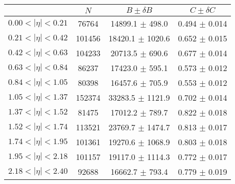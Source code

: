 \begin{tabular}{lccc}
\hline
    &   $N$   & $B \pm \delta B$  &  $C \pm \delta C$ \\
\hline
$0.00 < |\eta| <0.21$          & 76764      & 14899.1    $\pm$ 498.0 & 0.494      $\pm$ 0.014 \\
$0.21 < |\eta| <0.42$          & 101456     & 18420.1    $\pm$ 1020.6 & 0.652      $\pm$ 0.015 \\
$0.42 < |\eta| <0.63$          & 104233     & 20713.5    $\pm$ 690.6 & 0.677      $\pm$ 0.014 \\
$0.63 < |\eta| <0.84$          & 86237      & 17423.0    $\pm$ 595.1 & 0.573      $\pm$ 0.012 \\
$0.84 < |\eta| <1.05$          & 80398      & 16457.6    $\pm$ 705.9 & 0.553      $\pm$ 0.012 \\
$1.05 < |\eta| <1.37$          & 152374     & 33283.5    $\pm$ 1121.9 & 0.702      $\pm$ 0.014 \\
$1.37 < |\eta| <1.52$          & 81475      & 17012.2    $\pm$ 789.7 & 0.822      $\pm$ 0.018 \\
$1.52 < |\eta| <1.74$          & 113521     & 23769.7    $\pm$ 1474.7 & 0.813      $\pm$ 0.017 \\
$1.74 < |\eta| <1.95$          & 101361     & 19270.6    $\pm$ 1068.9 & 0.803      $\pm$ 0.018 \\
$1.95 < |\eta| <2.18$          & 101157     & 19117.0    $\pm$ 1114.3 & 0.772      $\pm$ 0.017 \\
$2.18 < |\eta| <2.40$          & 92688      & 16662.7    $\pm$ 793.4 & 0.779      $\pm$ 0.019 \\
\hline
\end{tabular}
